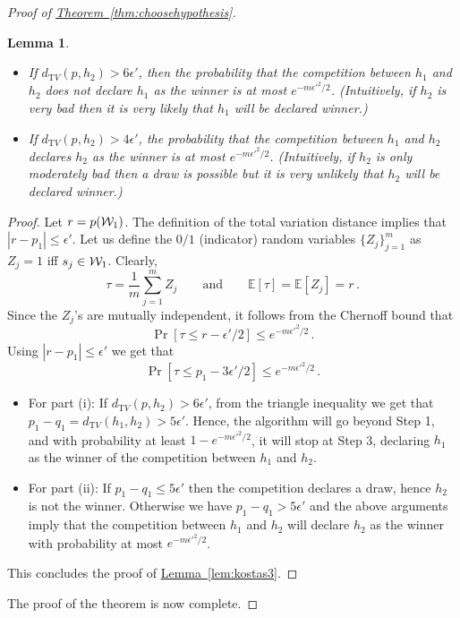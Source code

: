 \documentclass[10pt]{article}
\newtheorem{lemma}[theorem]{Lemma}
\theoremstyle{definition}
\numberwithin{equation}{section}
\newcommand{\expref}[2]{\texorpdfstring{\hyperref[#2]{#1~\ref{#2}}}{#1~\ref{#2}}}
\newcommand{\dtv}{d_{\mathrm TV}}
\newcommand{\eps}{\epsilon}
\begin{document}
\begin{proof}[Proof of \expref{Theorem}{thm:choosehypothesis}]
\begin{lemma}
\begin{itemize}
\item[(i)] If $\dtv(p, h_2)>6 \eps'$, then the probability that the competition between
$h_1$ and $h_2$ does not declare $h_1$ as the winner is at most $e^{- {m \eps'^2 /2 } }$.  (Intuitively,
if $h_2$ is very bad then it is very likely that $h_1$ will be declared winner.)

\item[(ii)]  If $\dtv(p, h_2)>4 \eps'$, the probability that the competition between $h_1$
and $h_2$ declares $h_2$ as the winner is at most $e^{- {m \eps'^2/ 2 } }$.  (Intuitively, if $h_2$
is only moderately bad then a draw is possible but it is very unlikely that $h_2$ will be declared winner.)
\end{itemize}
\end{lemma}


%
\begin{proof}
Let $r=p({\cal W}_1)$. The definition of the total variation distance
implies that $|r-p_1| \le \eps'$. Let us define the $0/1$ (indicator)
random variables $\{Z_j\}_{j=1}^m$ as $Z_j=1$ iff $s_j \in {\cal
  W}_1$. Clearly, \[
\tau=\frac{1}{m} \sum_{j=1}^m Z_j\qquad\text{and}\qquad
\mathbb{E}[\tau]=\mathbb{E}[Z_j]=r\,.
\]
Since the $Z_j$'s are mutually independent, it follows from the
Chernoff bound that 
\[
\Pr[\tau \le r-{\eps'/2}] \le e^{- {m \eps'^2/2 } }\,.
\]
Using $|r-p_1| \le \eps'$ we get that 
\[
\Pr[\tau\le p_1-{3\eps'/2}] \le e^{- {m \eps'^2/2 } }\,.
\]
\begin{itemize}
\item For part (i): If $\dtv(p, h_2) > 6 \eps'$, from the triangle inequality we get that $p_1-q_1=\dtv(h_1, h_2) > 5 \eps' $.  Hence, the algorithm will go beyond Step 1, and with probability at least $1-e^{- {m \eps'^2/2 } }$, it will stop at Step 3, declaring $h_1$ as the winner of the competition between $h_1$ and $h_2$.

\item For part (ii):  If $p_1-q_1 \leq 5 \eps'$ then the competition declares a draw, hence $h_2$ is not the winner. Otherwise we have $p_1 - q_1 > 5\eps'$ and the above arguments imply that the competition between $h_1$ and $h_2$ will declare $h_2$ as the winner with probability at most $e^{- {m \eps'^2/2 } }$.
\end{itemize}
This concludes the proof of \expref{Lemma}{lem:kostas3}.
\end{proof}

\noindent
The proof of the theorem is now complete.
\end{proof}
\end{document}
